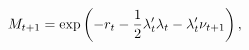 \begin{equation} \label{eq:nSDF}
	M_{t+1} = \exp\left( -r_{t} -\frac{1}{2} \lambda_{t}'\lambda_{t} - \lambda_{t}'\nu_{t+1} \right) ,
\end{equation}